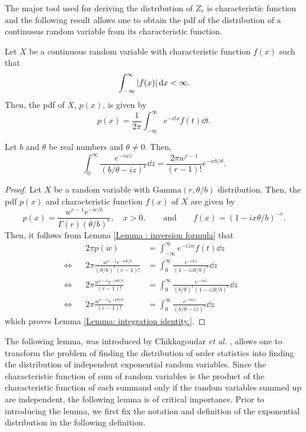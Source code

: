 \documentclass{report}
\begin{document}
The major tool used for deriving the distribution of $Z_r$ is characteristic function and the following result allows one
to obtain the pdf of the distribution of a continuous random variable from its characteristic function.

 \begin{lem} \label{Lemma : inversion formula}
     Let $X$ be  a continuous random variable with characteristic function $f(x)$ such that
     \[ 
         \int_{-\infty}^{\infty} \abs{f(x)} \dd{x} < \infty.
     \]
     Then, the pdf of $X$, $p(x)$, is given by
     \[ 
     p(x) = \frac{1}{2\pi} \int_{-\infty}^{\infty} e^{-itx} f(t) \dd{t}.
     \]
 \end{lem}

 \begin{lem} \label{Lemma: integration identity.}
     Let $b$ and $\theta$ be real numbers and $\theta  \neq 0$. Then,
     \[ 
         \int_0^\infty \frac{e^{-iwz}}{(b/\theta - iz)^r} \dd{z} = \frac{2\pi w^{r-1}}{(r-1)!} e^{-wb/\theta}.
     \]
 \end{lem}
 
 \begin{proof}
     Let $X$ be a random variable with $\mathrm{Gamma}(r,\theta/b)$ distribution. Then, the pdf $p(x)$ and characteristic function $f(x)$ of $X$ are given by
     \[ 
         p(x) =  \frac{w^{r-1}e^{-w/b}}{\Gamma(r) (\theta/b)^r },\quad x>0, \qquad \text{and} \qquad f(x) = (1-ix \theta/b)^{-r}.
     \]
     Then, it follows from Lemma \ref{Lemma : inversion formula} that
     \begin{align*}
        &&  2\pi p(w) &= \int_{-\infty}^{\infty} e^{-izw} f(t) \dd{z}
         & \\
        \iff&& 2\pi \frac{w^{r-1}e^{-w\theta/b}}{(\theta/b)^r(r-1)!} &= \int_0^\infty \frac{e^{-iwz}}{(1-iz\theta/b)^r} \dd{z}
         & \\
        \iff&& 2\pi \frac{w^{r-1}e^{-w\theta/b}}{(r-1)!} &= \int_0^\infty \frac{e^{-iwz}}{(b/\theta)^r  (1-iz\theta/b)^r} \dd{z}
         & \\
       \iff&& 2\pi \frac{w^{r-1}e^{-w\theta/b}}{(r-1)!} &= \int_0^\infty \frac{e^{-iwz}}{(b/\theta - iz)^r} \dd{z}   
     \end{align*}
     which proves Lemma \ref{Lemma: integration identity.}.
 \end{proof}
 
 The following lemma, was introduced by Chikkagoudar \textit{et al.} \cite{chikkagoudar1983distributions}, allows one to transform the problem of finding the distribution of order statistics into finding the distribution
 of independent exponential random variables. Since the characteristic function of sum of random variables is the product of the characteristic function
 of each summand only if the random variables summed up are independent, the following lemma is of critical importance. Prior to introducing
 the lemma, we first fix the notation and definition of the exponential distribution in the following definition.
\end{document}

